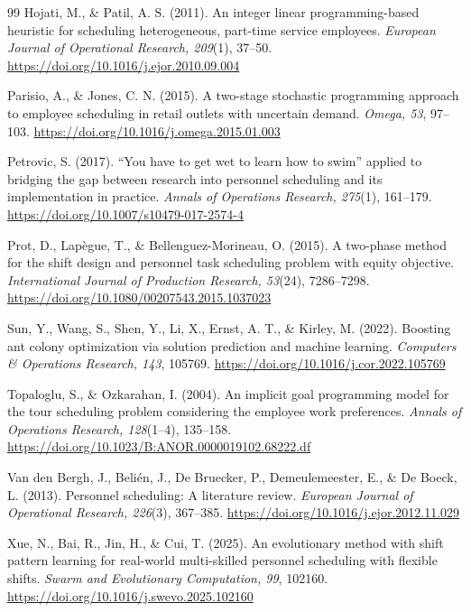 \documentclass[12pt]{article}
\begin{document}
\begin{thebibliography}{99}
Hojati, M., \& Patil, A. S. (2011).
An integer linear programming-based heuristic for scheduling heterogeneous, part-time service employees.
\textit{European Journal of Operational Research, 209}(1), 37--50.
\url{https://doi.org/10.1016/j.ejor.2010.09.004}

Parisio, A., \& Jones, C. N. (2015).
A two-stage stochastic programming approach to employee scheduling in retail outlets with uncertain demand.
\textit{Omega, 53}, 97--103.
\url{https://doi.org/10.1016/j.omega.2015.01.003}

Petrovic, S. (2017).
``You have to get wet to learn how to swim'' applied to bridging the gap between research into personnel scheduling and its implementation in practice.
\textit{Annals of Operations Research, 275}(1), 161--179.
\url{https://doi.org/10.1007/s10479-017-2574-4}

Prot, D., Lap\`egue, T., \& Bellenguez-Morineau, O. (2015).
A two-phase method for the shift design and personnel task scheduling problem with equity objective.
\textit{International Journal of Production Research, 53}(24), 7286--7298.
\url{https://doi.org/10.1080/00207543.2015.1037023}

Sun, Y., Wang, S., Shen, Y., Li, X., Ernst, A. T., \& Kirley, M. (2022).
Boosting ant colony optimization via solution prediction and machine learning.
\textit{Computers \& Operations Research, 143}, 105769.
\url{https://doi.org/10.1016/j.cor.2022.105769}

Topaloglu, S., \& Ozkarahan, I. (2004).
An implicit goal programming model for the tour scheduling problem considering the employee work preferences.
\textit{Annals of Operations Research, 128}(1--4), 135--158.
\url{https://doi.org/10.1023/B:ANOR.0000019102.68222.df}

Van den Bergh, J., Beli\'en, J., De Bruecker, P., Demeulemeester, E., \& De Boeck, L. (2013).
Personnel scheduling: A literature review.
\textit{European Journal of Operational Research, 226}(3), 367--385.
\url{https://doi.org/10.1016/j.ejor.2012.11.029}

Xue, N., Bai, R., Jin, H., \& Cui, T. (2025).
An evolutionary method with shift pattern learning for real-world multi-skilled personnel scheduling with flexible shifts.
\textit{Swarm and Evolutionary Computation, 99}, 102160.
\url{https://doi.org/10.1016/j.swevo.2025.102160}

\end{thebibliography}
\end{document}
